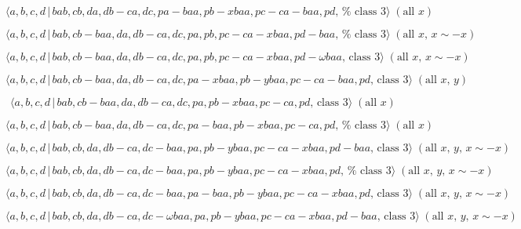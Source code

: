 \documentclass[10pt]{article}
\begin{document}
\begin{equation}
\langle a,b,c,d\,|\,bab,cb,da,db-ca,dc,pa-baa,pb-xbaa,pc-ca-baa,pd,\,\text{%
class }3\rangle \;(\text{all }x)  \tag{7.4445}
\end{equation}

\begin{equation}
\langle a,b,c,d\,|\,bab,cb-baa,da,db-ca,dc,pa,pb,pc-ca-xbaa,pd-baa,\,\text{%
class }3\rangle \;(\text{all }x,\,x\sim -x)  \tag{7.4446}
\end{equation}

\begin{equation}
\langle a,b,c,d\,|\,bab,cb-baa,da,db-ca,dc,pa,pb,pc-ca-xbaa,pd-\omega baa,\,%
\text{class }3\rangle \;(\text{all }x,\,x\sim -x)  \tag{7.4447}
\end{equation}

\begin{equation}
\langle a,b,c,d\,|\,bab,cb-baa,da,db-ca,dc,pa-xbaa,pb-ybaa,pc-ca-baa,pd,\,%
\text{class }3\rangle \;(\text{all }x,\,y)  \tag{7.4448}
\end{equation}

\begin{equation}
\langle a,b,c,d\,|\,bab,cb-baa,da,db-ca,dc,pa,pb-xbaa,pc-ca,pd,\,\text{class 
}3\rangle \;(\text{all }x)  \tag{7.4449}
\end{equation}

\begin{equation}
\langle a,b,c,d\,|\,bab,cb-baa,da,db-ca,dc,pa-baa,pb-xbaa,pc-ca,pd,\,\text{%
class }3\rangle \;(\text{all }x)  \tag{7.4450}
\end{equation}

\begin{equation}
\langle a,b,c,d\,|\,bab,cb,da,db-ca,dc-baa,pa,pb-ybaa,pc-ca-xbaa,pd-baa,\,%
\text{class }3\rangle \;(\text{all }x,\,y,\,x\sim -x)  \tag{7.4451}
\end{equation}

\begin{equation}
\langle a,b,c,d\,|\,bab,cb,da,db-ca,dc-baa,pa,pb-ybaa,pc-ca-xbaa,pd,\,\text{%
class }3\rangle \;(\text{all }x,\,y,\,x\sim -x)  \tag{7.4452}
\end{equation}

\begin{equation}
\langle a,b,c,d\,|\,bab,cb,da,db-ca,dc-baa,pa-baa,pb-ybaa,pc-ca-xbaa,pd,\,%
\text{class }3\rangle \;(\text{all }x,\,y,\,x\sim -x)  \tag{7.4453}
\end{equation}

\begin{equation}
\langle a,b,c,d\,|\,bab,cb,da,db-ca,dc-\omega
baa,pa,pb-ybaa,pc-ca-xbaa,pd-baa,\,\text{class }3\rangle \;(\text{all }%
x,\,y,\,x\sim -x)  \tag{7.4454}
\end{equation}
\end{document}
